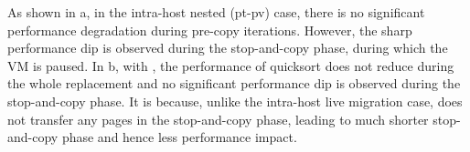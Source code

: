 

As shown in a, in the intra-host nested (pt-pv) case, there is no significant performance degradation during pre-copy iterations. However, the sharp performance dip is observed during the stop-and-copy phase, during which the VM is paused. 
In b, with \arch, the performance of quicksort does not reduce during the whole replacement and no significant performance dip is observed during the stop-and-copy phase. It is because, unlike the intra-host live migration case, \arch does not transfer any pages in the stop-and-copy phase, leading to much shorter stop-and-copy phase and hence less performance impact.   






